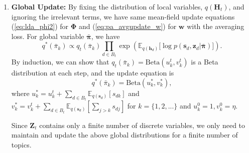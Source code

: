 \documentclass[twoside,11pt]{article}
\newcommand{\zv}{\bm{z}}
\newcommand{\sv}{\bm{s}}
\newcommand{\hv}{\bm{h}}
\newcommand{\Hv}{\bm{H}}
\newcommand{\wv}{\bm{w}}
\newcommand{\Phiv}{\bm{\Phi}}
\newcommand{\piv}{\bm \pi}
\newcommand{\barpiv}{\bm{\bar{\pi}}}
\newcommand{\ep}{\mathbb{E}}
\begin{document}
\begin{enumerate}
\item \textbf{Global Update: }  By fixing the distribution of local variables, $q(\Hv_t)$, and ignoring the irrelevant terms, we have same mean-field update equations (\ref{eq:lda_phi2}) for $\Phiv$ and (\ref{eq:pa_avgupdate_w}) for $\wv$ with the averaging loss. For global variable $\bar{\piv}$, we have
\begin{equation} \label{eq:hdp_beta}
q^*(\bar{\pi}_k) \propto q_t(\bar{\pi}_k) \prod_{d \in B_t} \exp\left( \ep_{q(\hv_d)} \Big[ \log p(\sv_d, \zv_d | \barpiv) \Big] \right).
\end{equation}
By induction, we can show that $q_t(\bar{\pi}_k) = \text{Beta}(u_k^t, v_k^t)$ is a Beta distribution at each step, and the update equation is
\begin{equation}
q^*(\bar{\pi}_k) = \text{Beta}(u_k^*, v_k^*),
\end{equation}
where $u_k^* = u_k^t + \sum_{d\in B_t} \ep_{q(\sv_d)}{[s_{dk}]}$ and $v_k^* = v_k^t + \sum_{d \in B_t} \ep_{q(\sv_d)}{[\sum_{j > k}{s_{dj}}]}$ for $k = \{1,2,...\}$ and $u_k^0 = 1, v_k^0 = \eta$.

Since $\bm{Z}_t$ contains only a finite number of discrete variables, we only need to maintain and update the above global distributions for a finite number of topics.


\end{enumerate}
\end{document}

